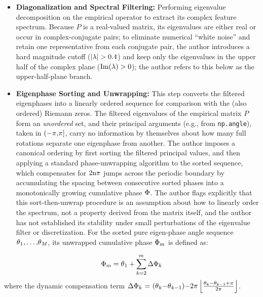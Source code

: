 \documentclass[mca,article,submit,oneauthor,pdftex]{Definitions/mdpi}
\begin{document}
\begin{itemize}
\item
  \textbf{Diagonalization and Spectral Filtering:} Performing eigenvalue
  decomposition on the empirical operator to extract its complex feature
  spectrum. Because $P$ is a real-valued matrix, its eigenvalues are either
  real or occur in complex-conjugate pairs; to eliminate numerical
  ``white noise'' and retain one representative from each conjugate pair,
  the author introduces a hard magnitude cutoff (\(\text{|}\text{\ensuremath{\lambda}}{|>0.4}\)) and
  keep only the eigenvalues in the upper half of the complex plane
  (\(\text{Im(}\text{\ensuremath{\lambda}}{)>0}\)); the author refers to this below as the
  upper-half-plane branch.
\item
  \textbf{Eigenphase Sorting and Unwrapping:} This step converts the
  filtered eigenphases into a linearly ordered sequence for comparison
  with the (also ordered) Riemann zeros. The filtered eigenvalues of the
  empirical matrix $P$ form an \emph{unordered} set, and their principal
  arguments (e.g., from \texttt{np.angle}), taken in
  \(\text{(\ensuremath{-}}\text{\ensuremath{\pi}}\text{,}\text{\ensuremath{\pi}}\text{]}\), carry no
  information by themselves about how many full rotations separate one
  eigenphase from another. The author imposes a canonical ordering by first sorting
  the filtered principal values, and then applying a standard phase-unwrapping
  algorithm to the sorted sequence, which
  compensates for \(\text{2}\text{n\ensuremath{\pi}}\) jumps across the
  periodic boundary by accumulating the spacing between consecutive sorted
  phases into a monotonically growing cumulative phase
  \(\text{\ensuremath{\Phi}}\). The author flags explicitly that this sort-then-unwrap
  procedure is an assumption about how to linearly order the spectrum, not
  a property derived from the matrix itself, and the author has not established
  its stability under small perturbations of the eigenvalue filter or
  discretization. For the sorted pure
  eigen-phase angle sequence
  \(\text{\ensuremath{\theta}}_{\text{1}}{,\ldots{},}\text{\ensuremath{\theta}}_{{M}}\), its unwrapped
  cumulative phase \(\text{\ensuremath{\Phi}}_{{m}}\) is defined as:
\end{itemize}

\begin{equation}
\text{\ensuremath{\Phi}}_{{m}}=\text{\ensuremath{\theta}}_{\text{1}}+\sum_{{k}=2}^{{m}}\text{\ensuremath{\Delta}}\text{\ensuremath{\Phi}}_{{k}}
\end{equation}
where the dynamic compensation term
  \(\text{\ensuremath{\Delta}}\text{\ensuremath{\Phi}}_{{k}}\text{~=~(}\text{\ensuremath{\theta}}_{{k}}\text{\ensuremath{-}}\text{\ensuremath{\theta}}_{{k}\text{\ensuremath{-}1}}\text{)\ensuremath{-}2}\text{\ensuremath{\pi}}\left\lfloor \frac{\text{\ensuremath{\theta}}_{\text{k}}\text{\ensuremath{-}}\text{\ensuremath{\theta}}_{\text{k}\text{\ensuremath{-}1}}\text{+}\text{\ensuremath{\pi}}}{\text{2}\text{\ensuremath{\pi}}} \right\rfloor\).
\end{document}
